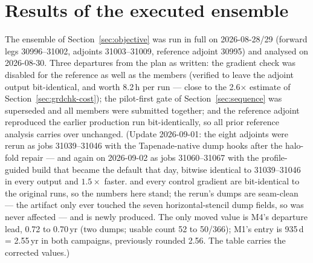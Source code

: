 %

\section{Results of the executed ensemble}
\label{sec:results}

The ensemble of Section~\ref{sec:objective} was run in full on
2026-08-28/29 (forward legs 30996--31002, adjoints 31003--31009, reference
adjoint 30995) and analysed on 2026-08-30. Three departures from the plan as
written: the gradient check was disabled for the reference as well as the
members (verified to leave the adjoint output bit-identical, and worth
8.2\,h per run --- close to the 2.6$\times$ estimate of
Section~\ref{sec:grdchk-cost}); the pilot-first gate of
Section~\ref{sec:sequence} was superseded and all members were submitted
together; and the reference adjoint reproduced the earlier production run
bit-identically, so all prior reference analysis carries over unchanged.
(Update 2026-09-01: the eight adjoints were rerun as jobs 31039--31046 with
the Tapenade-native dump hooks after the  halo-fold repair ---
and again on 2026-09-02 as jobs 31060--31067 with the profile-guided
 build that became the default that day, bitwise
identical to 31039--31046 in every output and $1.5\times$ faster.
 and every control gradient are bit-identical to the original runs,
so the numbers here stand; the rerun's  dumps are seam-clean ---
the artifact only ever touched the seven horizontal-stencil dump fields, so
 was never affected --- and  is newly
produced. The only moved value is M4's departure lead, 0.72 to 0.70\,yr
(two dumps; usable count 52 to 50/366); M1's entry is 935\,d = 2.55\,yr in
both campaigns, previously rounded 2.56. The table carries the corrected
values.)

